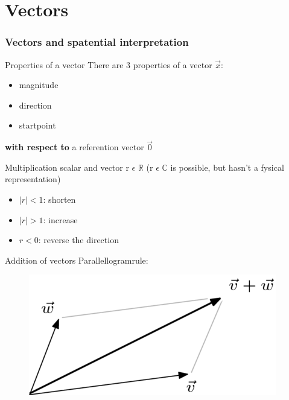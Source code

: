 \section{Vectors}

\begin{frame}
	\frametitle{Vectors and spatential interpretation}
	\begin{block}{Properties of a vector}
		There are 3 properties of a vector $\overrightarrow{x}$:
		\begin{itemize}
			\item magnitude
			\item direction
			\item startpoint
		\end{itemize}
		{\bf with respect to} a referention vector $\overrightarrow{0}$
	\end{block}
\end{frame}

\begin{frame}
	\begin{block}{Multiplication scalar and vector}
		r $\epsilon$ $\mathbb{R}$ (r $\epsilon$ $\mathbb{C}$ is possible, but hasn't a fysical representation)
		\begin{itemize}
			\item $|r|<1$: shorten
			\item $|r|>1$: increase
			\item $r<0$: reverse the direction
		\end{itemize}
	\end{block}
	\begin{block}{Addition of vectors}
		Parallellogramrule:

		\begin{figure}
			\centering
			\includegraphics[width=0.4\linewidth]{optelling}
		\end{figure}
	\end{block} 
\end{frame}

